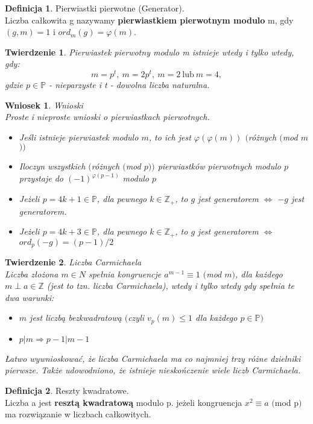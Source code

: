 \documentclass[10pt,a4paper]{article}
\theoremstyle{plain}
\newtheorem{thm}{Twierdzenie}[section]
\newtheorem*{cor}{Wniosek}
\theoremstyle{definition}
\newtheorem{defi}{Definicja}[section]
\theoremstyle{remark}
\newcommand{\Z}{\mathbb{Z}}
\newcommand{\p}{\mathbb{P}}
\begin{document}
	\begin{defi}{Pierwiastki pierwotne (Generator).}
		\\ Liczba całkowita g nazywamy \textbf{pierwiastkiem pierwotnym modulo} m, gdy $(g,m)=1$ i $ord_m(g)=\varphi(m)$.
	\end{defi}
	\begin{thm}
		Pierwiastek pierwotny modulo m istnieje wtedy i tylko wtedy, gdy:
	    $$m=p^t, ~ m=2p^t, ~ m=2 ~ \textrm{lub} ~ m=4,$$ gdzie $p \in \p$ - nieparzyste i t - dowolna liczba naturalna.
	\end{thm}
	\begin{cor}{Wnioski}
		\\
		Proste i nieproste wnioski o pierwiastkach pierwotnych.
		\begin{itemize}
			\item
			Jeśli istnieje pierwiastek modulo $m$, to ich jest $\varphi(\varphi(m))$ $($różnych $($mod $m$$))$
			\item
			Iloczyn wszystkich $($różnych $($mod $p))$ pierwiastków pierwotnych modulo $p$ przystaje do $(-1)^{\varphi(p-1)}$ modulo $p$ 
			\item
			Jeżeli $p=4k+1 \in \p$, dla pewnego $k \in \Z_{+}$, to $g$ jest generatorem $\Leftrightarrow$ $-g$ jest generatorem.
			\item
			Jeżeli $p=4k+3 \in \p$, dla pewnego $k \in \Z_{+}$, to $g$ jest generatorem $\Leftrightarrow$ $ord_p(-g)=(p-1)/2$
		\end{itemize}
	\end{cor}
	\begin{thm}{Liczba Carmichaela}
		\\
		Liczba złożona $m \in N$ spełnia kongruencje $a^{m-1} \equiv 1$ $($mod $m)$, dla każdego $m \perp a \in \Z$ (jest to tzn. liczba Carmichaela), wtedy i tylko wtedy gdy spełnia te dwa warunki:
		\begin{itemize}
			\item 
			$m$ jest liczbą bezkwadratową $($czyli $v_p(m) \leq 1$ dla każdego $p \in \p$$)$
			\item
			$p|m \Rightarrow p-1|m-1$ 
		\end{itemize}
		Łatwo wywnioskować, że liczba Carmichaela ma co najmniej trzy różne dzielniki pierwsze. Także udowodniono, że istnieje nieskończenie wiele liczb Carmichaela.
	\end{thm}
	\begin{defi}{Reszty kwadratowe.}
		\\ Liczba a jest \textbf{resztą kwadratową} modulo p. jeżeli kongruencja $x^2 \equiv a$ $($mod p$)$ ma rozwiązanie w liczbach całkowitych.
	\end{defi}
\end{document}
